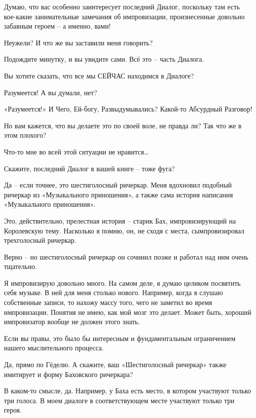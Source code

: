 \documentclass[../main.tex]{subfiles}
\begin{document}
\begin{dialogue}
 Думаю, что вас особенно заинтересует последний Диалог, поскольку там есть кое-какие занимательные замечания об импровизации, произнесенные довольно забавным героем \--- а именно, вами!

 Неужели? И что же вы заставили меня говорить?

 Подождите минутку, и вы увидите сами. Всё это \--- часть Диалога.

 Вы хотите сказать, что все мы СЕЙЧАС находимся в Диалоге?

 Разумеется! А вы думали, нет?

 «Разумеется!» И Чего, Ей-богу, Развыдумывались? Какой-то Абсурдный Разговор!

 Но вам кажется, что вы делаете это по своей воле, не правда ли? Так что же в этом плохого?

 Что-то мне во всей этой ситуации не нравится\ldots{}

 Скажите, последний Диалог в вашей книге \--- тоже фуга?

 Да \--- если точнее, это шестиголосный ричеркар. Меня вдохновил подобный ричеркар из «Музыкального приношения», а также сама история написания «Музыкального приношения».

 Это, действительно, прелестная история \--- старик Бах, импровизирующий на Королевскую тему. Насколько я помню, он, не сходя с места, сымпровизировал трехголосный ричеркар.

 Верно \--- но шестиголосный ричеркар он сочинил позже и работал над ним очень тщательно.

 Я импровизирую довольно много. На самом деле, я думаю целиком посвятить себя музыке. В ней для меня столько нового. Например, когда я слушаю собственные записи, то нахожу массу того, чего не заметил во время импровизации. Понятия не имею, как мой мозг это делает. Может быть, хороший импровизатор вообще не должен этого знать.

 Если вы правы, это было бы интересным и фундаментальным ограничением нашего мыслительного процесса.

 Да, прямо по Гёделю. А скажите, ваш «Шестиголосный ричеркар» также имитирует и форму Баховского ричеркара?

 В каком-то смысле, да. Например, у Баха есть место, в котором участвуют только три голоса. В моем диалоге в соответствующем месте участвуют только три героя.


\end{dialogue}
\end{document}
